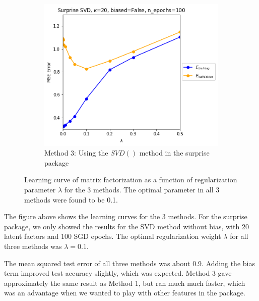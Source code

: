 \begin{figure}[H]
	\begin{subfigure}[t]{0.3\textwidth}
		\centering
		\includegraphics[width=\textwidth]{SVDNoBias_RegErr}
		\caption{Method 3: Using the $SVD()$ method in the surprise package}
	\end{subfigure}
	\caption{Learning curve of matrix factorization as a function of regularization parameter $\lambda$ for the 3 methods. The optimal parameter in all 3 methods were found to be 0.1.}
\end{figure}

The figure above shows the learning curves for the 3 methods. For the surprise package, we only showed the results for the SVD method without bias, with 20 latent factors and 100 SGD epochs. The optimal regularization weight $\lambda$ for all three methods was $\lambda=0.1$.

The mean squared test error of all three methods was about 0.9. Adding the bias term improved test accuracy slightly, which was expected. Method 3 gave approximately the same result as Method 1, but ran much much faster, which was an advantage when we wanted to play with other features in the package. \newline

